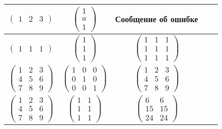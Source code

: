 \begin{table}[h]
\begin{center}
\begin{tabular}{|c|c|c|c|c|}
		$\begin{pmatrix}
			1 & 2 & 3
		\end{pmatrix}$ &
		$\begin{pmatrix}
			1 \\
			a \\
			1
		\end{pmatrix}$ &
		Сообщение об ошибке \\ \hline

		$\begin{pmatrix}
			1 & 1 & 1
		\end{pmatrix}$ &
		$\begin{pmatrix}
			1 \\
			1 \\
			1
		\end{pmatrix}$ &
		$\begin{pmatrix}
			1 & 1 & 1\\
			1 & 1 & 1 \\
			1 & 1 & 1
		\end{pmatrix}$ \\ \hline

		$\begin{pmatrix}
			1 & 2 & 3 \\
			4 & 5 & 6 \\
			7 & 8 & 9
		\end{pmatrix}$ &
		$\begin{pmatrix}
			1 & 0 & 0 \\
			0 & 1 & 0 \\
			0 & 0 & 1
		\end{pmatrix}$ &
		$\begin{pmatrix}
			1 & 2 & 3 \\
			4 & 5 & 6 \\
			7 & 8 & 9
		\end{pmatrix}$ \\ \hline

		$\begin{pmatrix}
			1 & 2 & 3 \\
			4 & 5 & 6 \\
			7 & 8 & 9
		\end{pmatrix}$ &
		$\begin{pmatrix}
			1 & 1 \\
			1 & 1 \\
			1 & 1 
		\end{pmatrix}$ &
		$\begin{pmatrix}
			6 & 6 \\
			15 & 15 \\
			24 & 24
		\end{pmatrix}$ \\ \hline


\end{tabular}
\end{center}
\end{table}

